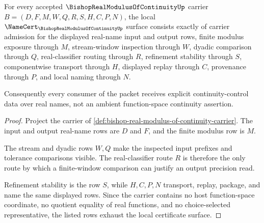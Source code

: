 \begin{theorem}
\label{thm:bishop-real-modulus-of-continuity-namecert-obligations}
For every accepted $\BishopRealModulusOfContinuityUp$ carrier $B=(D,F,M,W,Q,R,S,H,C,P,N)$, the local $\NameCert_{\BishopRealModulusOfContinuityUp}$ surface consists exactly of carrier admission for the displayed real-name input and output rows, finite modulus exposure through $M$, stream-window inspection through $W$, dyadic comparison through $Q$, real-classifier routing through $R$, refinement stability through $S$, componentwise transport through $H$, displayed replay through $C$, provenance through $P$, and local naming through $N$.

Consequently every consumer of the packet receives explicit continuity-control data over real names, not an ambient function-space continuity assertion.
\end{theorem}
\begin{proof}
Project the carrier of \autoref{def:bishop-real-modulus-of-continuity-carrier}. The input and output real-name rows are $D$ and $F$, and the finite modulus row is $M$.

The stream and dyadic rows $W,Q$ make the inspected input prefixes and tolerance comparisons visible. The real-classifier route $R$ is therefore the only route by which a finite-window comparison can justify an output precision read.

Refinement stability is the row $S$, while $H,C,P,N$ transport, replay, package, and name the same displayed rows. Since the carrier contains no host function-space coordinate, no quotient equality of real functions, and no choice-selected representative, the listed rows exhaust the local certificate surface.
\end{proof}


\begin{closurestatus}{\BishopRealModulusOfContinuityUp}
  \theoryclosure{\seedClosure}
  \formalstatus{\unformalizedV}
\end{closurestatus}
